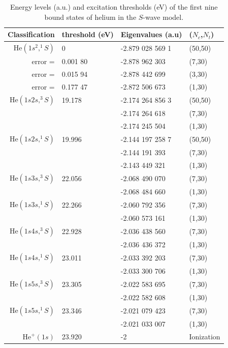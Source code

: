\documentclass[aip
, pra
, showpacs
, aps
, twocolumn
, groupedaddress
, floatfix
]{revtex4}
\begin{document}
\begin{table}[htb]
\caption{\label{Tab_ENGS}
Energy levels (a.u.) and excitation thresholds (eV) of the first nine bound states of helium in the
$S$-wave model.
}
\begin{ruledtabular}
\begin{tabular}{rlll}
Classification & threshold (eV) & Eigenvalues (a.u) & ($N_c$,$N_t$)   \\
\hline
$\mbox{He}(1s^2,^1S)$ & 0  & -2.879 028 569 1 &  (50,50)   \\ %
            error =   & 0.001 80 & -2.878 962 303   &  (7,30)    \\
            error =   & 0.015 94 & -2.878 442 699   &  (3,30)    \\
            error =   & 0.177 47 & -2.872 506 673   &  (1,30)    \\
\hline
$\mbox{He}(1s2s,^3S)$   & 19.178  & -2.174 264 856 3 & (50,50) \\  %
                 &  & -2.174 264 618   &  (7,30)   \\
                &  & -2.174 245 504   &  (1,30)    \\
\hline
$\mbox{He}(1s2s,^1S)$     &  19.996 & -2.144 197 258 7 &  (50,50) \\ %
                          &  & -2.144 191 393   &  (7,30)   \\
                          &   & -2.143 449 321   &  (1,30)    \\
\hline
$\mbox{He}(1s3s,^3S)$     & 22.056  & -2.068 490 070   &  (7,30)   \\
                          &        & -2.068 484 660   &  (1,30)    \\
\hline
$\mbox{He}(1s3s,^1S)$     & 22.266   & -2.060 792 356   & (7,30)    \\
                          &          & -2.060 573 161   &  (1,30)    \\
\hline
$\mbox{He}(1s4s,^3S)$    & 22.928  & -2.036 438 560   &  (7,30)    \\
                         &         & -2.036 436 372   &  (1,30)   \\
\hline
$\mbox{He}(1s4s,^1S)$   &  23.011 & -2.033 392 203 &  (7,30)   \\
                        &         & -2.033 300 706 &  (1,30)   \\
\hline
$\mbox{He}(1s5s,^3S)$   &   23.305  & -2.022 583 695   &  (7,30)    \\
                        &           & -2.022 582 608   &  (1,30)    \\
\hline
$\mbox{He}(1s5s,^1S)$   &  23.346   & -2.021 079 423   &  (7,30)    \\
                        &              & -2.021 033 007   &  (1,30)    \\
\hline
$\mbox{He}^+(1s)$       &  23.920 & -2 	 &    Ionization \\


\end{tabular}
\end{ruledtabular}
\end{table}
\end{document}

